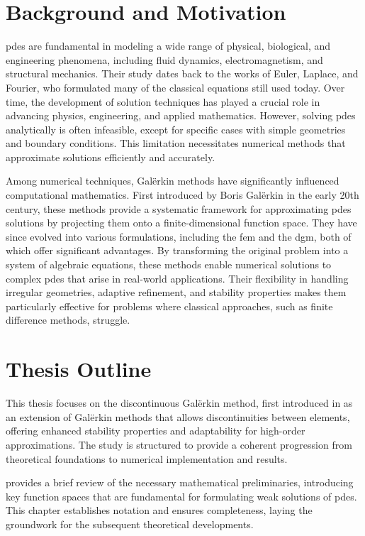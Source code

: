 \section{Background and Motivation}

\acrfull{pdes} are fundamental in modeling a wide range of physical, biological, and engineering phenomena, including fluid dynamics, electromagnetism, and structural mechanics. Their study dates back to the works of Euler, Laplace, and Fourier, who formulated many of the classical equations still used today. Over time, the development of solution techniques has played a crucial role in advancing physics, engineering, and applied mathematics. However, solving \acrshort{pdes} analytically is often infeasible, except for specific cases with simple geometries and boundary conditions. This limitation necessitates numerical methods that approximate solutions efficiently and accurately.

Among numerical techniques, Galërkin methods have significantly influenced computational mathematics. First introduced by Boris Galërkin in the early 20th century, these methods provide a systematic framework for approximating \acrshort{pdes} solutions by projecting them onto a finite-dimensional function space. They have since evolved into various formulations, including the \acrfull{fem} and the \acrfull{dgm}, both of which offer significant advantages. By transforming the original problem into a system of algebraic equations, these methods enable numerical solutions to complex \acrshort{pdes} that arise in real-world applications. Their flexibility in handling irregular geometries, adaptive refinement, and stability properties makes them particularly effective for problems where classical approaches, such as finite difference methods, struggle.

\newpage
\section{Thesis Outline}

This thesis focuses on the discontinuous Galërkin method, first introduced in  as an extension of Galërkin methods that allows discontinuities between elements, offering enhanced stability properties and adaptability for high-order approximations. The study is structured to provide a coherent progression from theoretical foundations to numerical implementation and results.

 provides a brief review of the necessary mathematical preliminaries, introducing key function spaces that are fundamental for formulating weak solutions of \acrshort{pdes}. This chapter establishes notation and ensures completeness, laying the groundwork for the subsequent theoretical developments.


